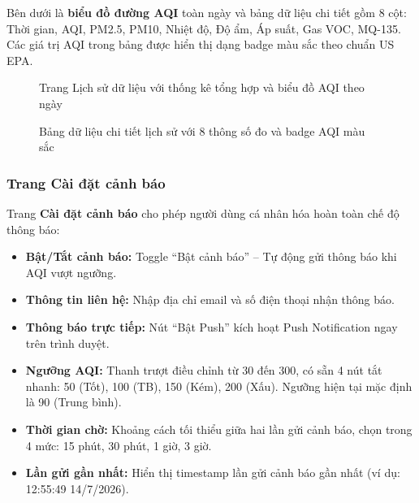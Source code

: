 \documentclass[12pt,a4paper]{article}
\begin{document}
Bên dưới là \textbf{biểu đồ đường AQI} toàn ngày và bảng dữ liệu chi tiết gồm 8 cột: Thời gian, AQI, PM2.5, PM10, Nhiệt độ, Độ ẩm, Áp suất, Gas VOC, MQ-135. Các giá trị AQI trong bảng được hiển thị dạng badge màu sắc theo chuẩn US EPA.

\begin{figure}[H]
    \centering
    \caption{Trang Lịch sử dữ liệu với thống kê tổng hợp và biểu đồ AQI theo ngày}
    \label{fig:history_page}
\end{figure}

\begin{figure}[H]
    \centering
    \caption{Bảng dữ liệu chi tiết lịch sử với 8 thông số đo và badge AQI màu sắc}
    \label{fig:history_table}
\end{figure}

\subsubsection{Trang Cài đặt cảnh báo}

Trang \textbf{Cài đặt cảnh báo} cho phép người dùng cá nhân hóa hoàn toàn chế độ thông báo:
\begin{itemize}
    \item \textbf{Bật/Tắt cảnh báo:} Toggle ``Bật cảnh báo'' -- Tự động gửi thông báo khi AQI vượt ngưỡng.
    \item \textbf{Thông tin liên hệ:} Nhập địa chỉ email và số điện thoại nhận thông báo.
    \item \textbf{Thông báo trực tiếp:} Nút ``Bật Push'' kích hoạt Push Notification ngay trên trình duyệt.
    \item \textbf{Ngưỡng AQI:} Thanh trượt điều chỉnh từ 30 đến 300, có sẵn 4 nút tắt nhanh: 50 (Tốt), 100 (TB), 150 (Kém), 200 (Xấu). Ngưỡng hiện tại mặc định là 90 (Trung bình).
    \item \textbf{Thời gian chờ:} Khoảng cách tối thiểu giữa hai lần gửi cảnh báo, chọn trong 4 mức: 15 phút, 30 phút, 1 giờ, 3 giờ.
    \item \textbf{Lần gửi gần nhất:} Hiển thị timestamp lần gửi cảnh báo gần nhất (ví dụ: 12:55:49 14/7/2026).
\end{itemize}
\end{document}
